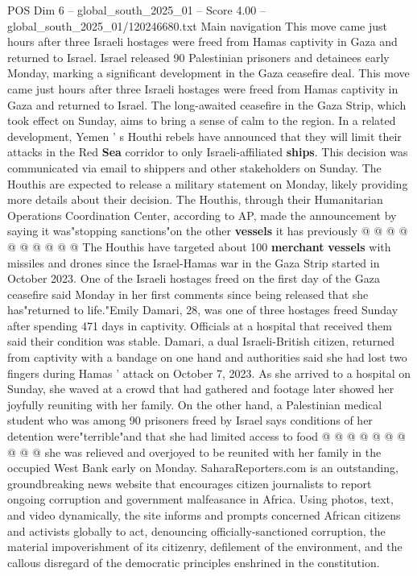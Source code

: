 \begin{textsample}{POS Dim 6 – global\_south\_2025\_01 – Score 4.00 – global\_south\_2025\_01/120246680.txt}  \label{ex:f6_pos_443}
Main navigation This move came just hours after three Israeli hostages were freed from Hamas captivity in Gaza and returned to Israel.
Israel released 90 Palestinian prisoners and detainees early Monday, marking a significant development in the Gaza ceasefire deal.
This move came just hours after three Israeli hostages were freed from Hamas captivity in Gaza and returned to Israel.
The long-awaited ceasefire in the Gaza Strip, which took effect on Sunday, aims to bring a sense of calm to the region.
In a related development, Yemen ' s Houthi rebels have announced that they will limit their attacks in the Red \textbf{Sea} corridor to only Israeli-affiliated \textbf{ships}.
This decision was communicated via email to shippers and other stakeholders on Sunday.
The Houthis are expected to release a military statement on Monday, likely providing more details about their decision.
The Houthis, through their Humanitarian Operations Coordination Center, according to AP, made the announcement by saying it was"stopping sanctions"on the other \textbf{vessels} it has previously @ @ @ @ @ @ @ @ @ @ The Houthis have targeted about 100 \textbf{merchant} \textbf{vessels} with missiles and drones since the Israel-Hamas war in the Gaza Strip started in October 2023.
One of the Israeli hostages freed on the first day of the Gaza ceasefire said Monday in her first comments since being released that she has"returned to life."Emily Damari, 28, was one of three hostages freed Sunday after spending 471 days in captivity.
Officials at a hospital that received them said their condition was stable.
Damari, a dual Israeli-British citizen, returned from captivity with a bandage on one hand and authorities said she had lost two fingers during Hamas ' attack on October 7, 2023.
As she arrived to a hospital on Sunday, she waved at a crowd that had gathered and footage later showed her joyfully reuniting with her family.
On the other hand, a Palestinian medical student who was among 90 prisoners freed by Israel says conditions of her detention were"terrible"and that she had limited access to food @ @ @ @ @ @ @ @ @ @ she was relieved and overjoyed to be reunited with her family in the occupied West Bank early on Monday.
SaharaReporters.com is an outstanding, groundbreaking news website that encourages citizen journalists to report ongoing corruption and government malfeasance in Africa.
Using photos, text, and video dynamically, the site informs and prompts concerned African citizens and activists globally to act, denouncing officially-sanctioned corruption, the material impoverishment of its citizenry, defilement of the environment, and the callous disregard of the democratic principles enshrined in the constitution.

\end{textsample}

